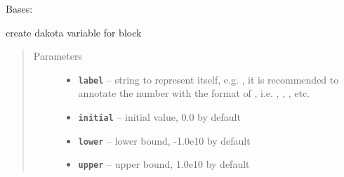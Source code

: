 \documentclass[letterpaper,10pt,english]{sphinxmanual}
\begin{document}

\begin{fulllineitems}
\label{src/apidocs/genopt:genopt.DakotaParam}
Bases: \href{https://docs.python.org/2/library/functions.html\#object}{}

create dakota variable for  block
\begin{quote}\begin{description}
\item[{Parameters}] \leavevmode\begin{itemize}
\item {} 
\textbf{\texttt{label}} -- string to represent itself, e.g. ,
it is recommended to annotate the number with the format of ,
i.e. , , , etc.

\item {} 
\textbf{\texttt{initial}} -- initial value, 0.0 by default

\item {} 
\textbf{\texttt{lower}} -- lower bound, -1.0e10 by default

\item {} 
\textbf{\texttt{upper}} -- upper bound, 1.0e10 by default

\end{itemize}

\end{description}\end{quote}

\begin{fulllineitems}
\label{src/apidocs/genopt:genopt.DakotaParam.initial}
\end{fulllineitems}


\begin{fulllineitems}
\label{src/apidocs/genopt:genopt.DakotaParam.label}
\end{fulllineitems}


\begin{fulllineitems}
\label{src/apidocs/genopt:genopt.DakotaParam.lower}
\end{fulllineitems}


\begin{fulllineitems}
\label{src/apidocs/genopt:genopt.DakotaParam.upper}
\end{fulllineitems}


\end{fulllineitems}
\end{document}
